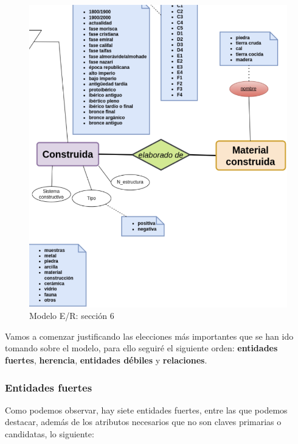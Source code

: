         \begin{figure}[H]
            \centering
            \includegraphics[scale=0.35]{imagenes/E-R6.png}
            \caption{Modelo E/R: sección 6}
            \label{fig:e-rmodel6}
        \end{figure}


    Vamos a comenzar justificando las elecciones más importantes que se han ido tomando
    sobre el modelo, para ello seguiré el siguiente orden: \textbf{entidades fuertes},
    \textbf{herencia}, \textbf{entidades débiles} y \textbf{relaciones}.\\

    \subsubsection{Entidades fuertes}
    Como podemos observar, hay siete entidades fuertes, entre las que podemos destacar,
    además de los atributos necesarios que no son claves primarias o candidatas, lo siguiente:

